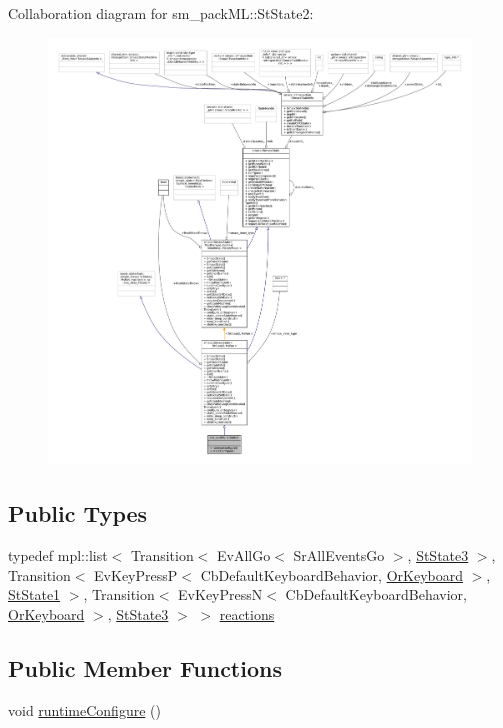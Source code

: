Collaboration diagram for sm\+\_\+pack\+ML\+:\+:St\+State2\+:
\nopagebreak
\begin{figure}[H]
\begin{center}
\leavevmode
\includegraphics[width=350pt]{structsm__packML_1_1StState2__coll__graph}
\end{center}
\end{figure}
\subsection*{Public Types}
\begin{DoxyCompactItemize}
\item 
typedef mpl\+::list$<$ Transition$<$ Ev\+All\+Go$<$ Sr\+All\+Events\+Go $>$, \hyperlink{structsm__packML_1_1StState3}{St\+State3} $>$, Transition$<$ Ev\+Key\+PressP$<$ Cb\+Default\+Keyboard\+Behavior, \hyperlink{classsm__packML_1_1OrKeyboard}{Or\+Keyboard} $>$, \hyperlink{structsm__packML_1_1StState1}{St\+State1} $>$, Transition$<$ Ev\+Key\+PressN$<$ Cb\+Default\+Keyboard\+Behavior, \hyperlink{classsm__packML_1_1OrKeyboard}{Or\+Keyboard} $>$, \hyperlink{structsm__packML_1_1StState3}{St\+State3} $>$ $>$ \hyperlink{structsm__packML_1_1StState2_a4b5bf712482f1cb878d795c52171264e}{reactions}
\end{DoxyCompactItemize}
\subsection*{Public Member Functions}
\begin{DoxyCompactItemize}
\item 
void \hyperlink{structsm__packML_1_1StState2_a60356179ffa3878b341742a6ca372e7f}{runtime\+Configure} ()
\end{DoxyCompactItemize}
